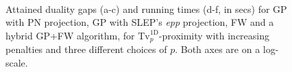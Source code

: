 \documentclass[twoside,11pt]{article}
\newcommand{\tvell}{\text{Tv}}
\newcommand{\oned}{\text{1D}}
\numberwithin{equation}{section}
\numberwithin{theorem}{section}
\begin{document}
\begin{figure}[htbp]
  \centering
  \\
  \caption{Attained duality gaps (a-c) and running times (d-f, in secs) for GP with PN projection, GP with SLEP's {\it epp} projection, FW and a hybrid GP+FW algorithm, for $\tvell_p^{\oned}$-proximity with increasing penalties and three different choices of $p$. Both axes are on a log-scale.
   \label{fig:tvplambdafixedrun}
   }
\end{figure}
\end{document}
